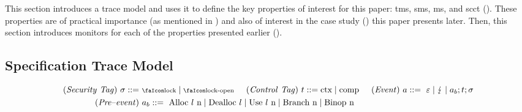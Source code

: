 \documentclass[utf8,acmsmall,review,screen,dvipsnames]{acmart}
\begin{document}
This section introduces a trace model and uses it to define the key properties of interest for this paper: \gls{tms}, \gls{sms}, \gls{ms}, and \gls{scct} ().
These properties are of practical importance (as mentioned in ) and also of interest in the case study () this paper presents later. 
Then, this section introduces monitors for each of the properties presented earlier ().


\subsection{Specification Trace Model}\label{subsec:propdefs}

\begin{gather*}
  \begin{aligned}
  \mi{(Security\ Tag)}~\sigma\bnfdef&\ \lock \mid \unlock\hspace{0.5cm}
  \mi{(Control\ Tag)}~\sandboxtag\bnfdef \ctx\mid\comp\hspace{0.5cm}
  \mi{(Event)}~\event\bnfdef\ \emptyevent \mid \lightning \mid \event[_{b}];\sandboxtag;\sigma \\
  \mi{(Pre\text{--}event)}&~\event[_{b}]\bnfdef\ \ev{Alloc\ \loc\ n} \mid \ev{Dealloc\ \loc} \mid \ev{Use\ \loc\ n} \mid \ev{Branch\ n} \mid \ev{Binop\ n} \\
  \end{aligned}
\end{gather*}
\end{document}
